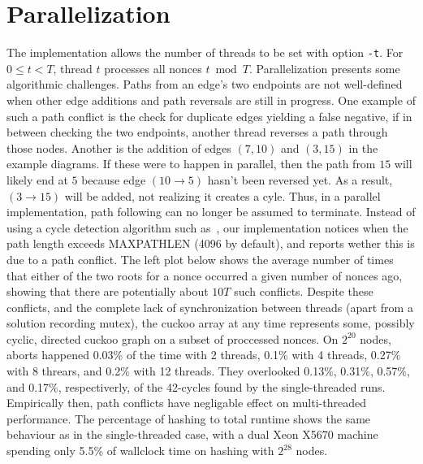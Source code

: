 \documentclass[11pt, oneside]{article}
\begin{document}
\section{Parallelization}
The implementation allows the number of threads to be set with option {\tt -t}.
For $0\leq t < T$, thread $t$ processes all nonces $t \bmod T$.
Parallelization presents some algorithmic challenges. Paths from an edge's two endpoints
are not well-defined when other edge additions and path reversals are still in progress.
One example of such a path conflict is the check for duplicate edges yielding a false negative,
if in between checking the two endpoints, another thread reverses a path through those nodes.
Another is the addition of edges $(7,10)$ and $(3,15)$ in the example diagrams.
If these were to happen in parallel, then the path from $15$ will likely end at $5$ because
edge $(10 \rightarrow 5)$ hasn't been reversed yet.
As a result, $(3 \rightarrow 15)$ will be added, not realizing it creates a cyle.
Thus, in a parallel implementation, path following can no longer be assumed to terminate.
Instead of using a cycle detection algorithm such as~\cite{1980-brent-cycles}, our implementation
notices when the path length exceeds MAXPATHLEN (4096 by default),
and reports wether this is due to a path conflict.
The left plot below shows the average number of times that either of the two roots
for a nonce occurred a given number of nonces ago, showing that there are potentially
about $10T$ such conflicts.
Despite these conflicts, and the complete lack of synchronization between threads
(apart from a solution recording mutex),
the cuckoo array at any time represents some, possibly cyclic, directed cuckoo graph
on a subset of proccessed nonces.
On $2^{20}$ nodes, aborts happened 0.03\% of the time with 2 threads, 0.1\% with 4 threads, 0.27\% with
8 threars, and 0.2\% with 12 threads.
They overlooked 0.13\%, 0.31\%, 0.57\%, and 0.17\%, respectiverly, of the 42-cycles
found by the single-threaded runs.
Empirically then, path conflicts have negligable effect on multi-threaded performance.
The percentage of hashing to total runtime shows the same behaviour as in the single-threaded case,
with a dual Xeon X5670 machine spending only 5.5\% of wallclock time on hashing with $2^{28}$ nodes.
\end{document}
